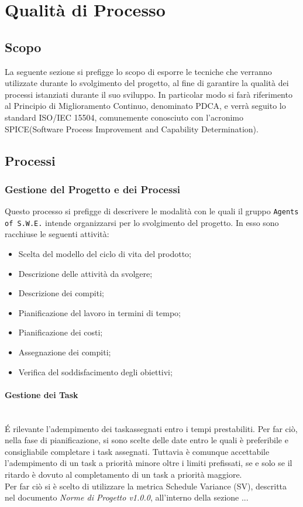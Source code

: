 \section{Qualità di Processo}
\label{qualitaProcesso}

\subsection{Scopo}

La seguente sezione si prefigge lo scopo di esporre le tecniche che verranno utilizzate durante lo svolgimento del progetto, al fine di garantire la qualità dei processi istanziati durante il suo sviluppo. In particolar modo si farà riferimento al Principio di Miglioramento Continuo, denominato PDCA\glossario, e verrà seguito lo standard ISO/IEC 15504, comunemente conosciuto con l'acronimo SPICE\glossario (Software Process Improvement and Capability Determination).

\subsection{Processi}
\subsubsection{Gestione del Progetto e dei Processi} 

Questo processo si prefigge di descrivere le modalità con le quali il gruppo \texttt{Agents of S.W.E.} intende organizzarsi per lo svolgimento del progetto. In esso sono racchiuse le seguenti attività:
\begin{itemize}
	\item Scelta del modello del ciclo di vita del prodotto;
	\item Descrizione delle attività da svolgere;
	\item Descrizione dei compiti;
	\item Pianificazione del lavoro in termini di tempo;
	\item Pianificazione dei costi;
	\item Assegnazione dei compiti;
	\item Verifica del soddisfacimento degli obiettivi;
\end{itemize}

\paragraph{Gestione dei Task} \-\\
\'E rilevante	 l'adempimento dei task\glossario assegnati entro i tempi prestabiliti. Per far ciò, nella fase di pianificazione, si sono scelte delle date entro le quali è preferibile e consigliabile completare i task assegnati. Tuttavia è comunque accettabile l'adempimento di un task a priorità minore oltre i limiti prefissati, se e solo se il ritardo è dovuto al completamento di un task a priorità maggiore.\\
Per far ciò si è scelto di utilizzare la metrica Schedule Variance (SV), descritta nel documento \textit{Norme di Progetto v1.0.0}, all'interno della sezione ...  

